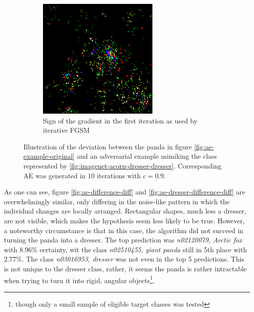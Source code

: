 \documentclass[11pt, a4paper]{article}
\begin{document}
\begin{figure}[htp]
\begin{subfigure}[b]{0.45\textwidth}
        \includegraphics[width=\textwidth]{aes_new/panda_dresser_10_0dot9_grad.png}
        \caption{Sign of the gradient in the first iteration as used by iterative FGSM}
        \label{fig:ae-dresser-difference-grad}
    \end{subfigure}
    \caption{Illustration of the deviation between the panda in figure \ref{fig:ae-example-original} and an adversarial example mimiking the class represented by \ref{fig:imagenet-acorn-dresser-dresser}. Corresponding AE was generated in $10$ iterations with $c = 0.9$.}
    \label{fig:ae-dresser-difference}
\end{figure}

As one can see, figure \ref{fig:ae-difference-diff} and \ref{fig:ae-dresser-difference-diff} are overwhelmingly similar, only differing in the noise-like pattern in which the individual changes are locally arranged. Rectangular shapes, much less a dresser, are not visible, which makes the hypothesis seem less likely to be true. However, a noteworthy circumstance is that in this case, the algorithm did not succeed in turning the panda into a dresser. The top prediction was \emph{n02120079, Arctic fox} with $8.96\%$ certainty, wit the class \emph{n02510455, giant panda} still in 5th place with $2.77\%$. The class \emph{n03016953, dresser} was not even in the top 5 predictions. This is not unique to the dresser class, rather, it seems the panda is rather intractable when trying to turn it into rigid, angular objects\footnote{though only a small sample of eligible target classes was tested}.
\end{document}
